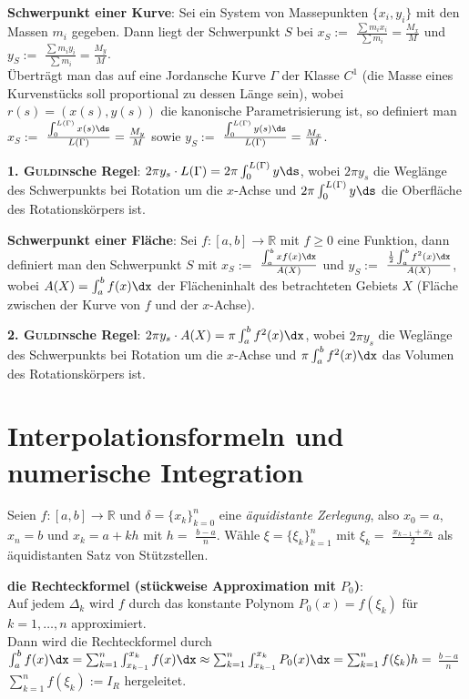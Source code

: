 \linie

\textbf{Schwerpunkt einer Kurve}:
Sei ein System von Massepunkten $\{x_i, y_i\}$ mit den Massen $m_i$ gegeben.
Dann liegt der Schwerpunkt $S$ bei
$x_S :=$ {\large $\frac{\sum m_i x_i}{\sum m_i} = \frac{M_x}{M}$} und
$y_S :=$ {\large $\frac{\sum m_i y_i}{\sum m_i} = \frac{M_y}{M}$}. \\
Überträgt man das auf eine Jordansche Kurve $\Gamma$ der Klasse $C^1$
(die Masse eines Kurvenstücks soll proportional
zu dessen Länge sein), wobei $r(s) = (x(s), y(s))$ die kanonische
Parametrisierung ist, so definiert man $x_S :=$
{\large $\frac{\int_0^{L(\Gamma)} x(s)\ds}{L(\Gamma)} = \frac{M_y}{M}$}
sowie $y_S :=$
{\large $\frac{\int_0^{L(\Gamma)} y(s)\ds}{L(\Gamma)} = \frac{M_x}{M}$}.

\textbf{1. \textsc{Guldin}sche Regel}:
$2\pi y_s \cdot L(\Gamma) = 2\pi \int_0^{L(\Gamma)} y\ds$, wobei
$2\pi y_s$ die Weglänge des Schwerpunkts bei Rotation um die $x$-Achse
und $2\pi \int_0^{L(\Gamma)} y\ds$ die Oberfläche des Rotationskörpers ist.

\linie

\textbf{Schwerpunkt einer Fläche}:
Sei $f: [a,b] \rightarrow \mathbb{R}$ mit $f \ge 0$ eine Funktion,
dann definiert man den Schwerpunkt $S$ mit
$x_S :=$ {\large $\frac{\int_a^b xf(x)\dx}{A(X)}$} und
$y_S :=$ {\large $\frac{\frac{1}{2} \int_a^b f^2(x)\dx}{A(X)}$}, wobei
$A(X) = \int_a^b f(x)\dx$ der Flächeninhalt des betrachteten Gebiets $X$
(Fläche zwischen der Kurve von $f$ und der $x$-Achse).

\textbf{2. \textsc{Guldin}sche Regel}:
$2\pi y_s \cdot A(X) = \pi \int_a^b f^2(x)\dx$, wobei
$2\pi y_s$ die Weglänge des Schwerpunkts bei Rotation um die $x$-Achse
und $\pi \int_a^b f^2(x)\dx$ das Volumen
des Rotationskörpers ist.

\section{%
    Interpolationsformeln und numerische Integration%
}

Seien $f: [a,b] \rightarrow \mathbb{R}$ und $\delta = \{x_k\}_{k=0}^n$
eine \emph{äquidistante Zerlegung}, also $x_0 = a$, $x_n = b$ und
$x_k = a + kh$ mit $h =$ {\large $\frac{b - a}{n}$}.
Wähle $\xi = \{\xi_k\}_{k=1}^n$ mit
$\xi_k =$ {\large $\frac{x_{k-1} + x_k}{2}$} als äquidistanten
Satz von Stützstellen.

\linie

\textbf{die Rechteckformel (stückweise Approximation mit $P_0$)}: \\
Auf jedem $\Delta_k$ wird $f$ durch das konstante Polynom
$P_0(x) = f(\xi_k)$ für $k = 1, \ldots, n$ approximiert. \\
Dann wird die Rechteckformel durch
$\int_a^b f(x)\dx = \sum_{k=1}^n \int_{x_{k-1}}^{x_k} f(x)\dx
\approx \sum_{k=1}^n \int_{x_{k-1}}^{x_k} P_0(x)\dx
= \sum_{k=1}^n f(\xi_k) h =$
{\large $\frac{b - a}{n}$} $\sum_{k=1}^n f(\xi_k) := I_R$ hergeleitet.

